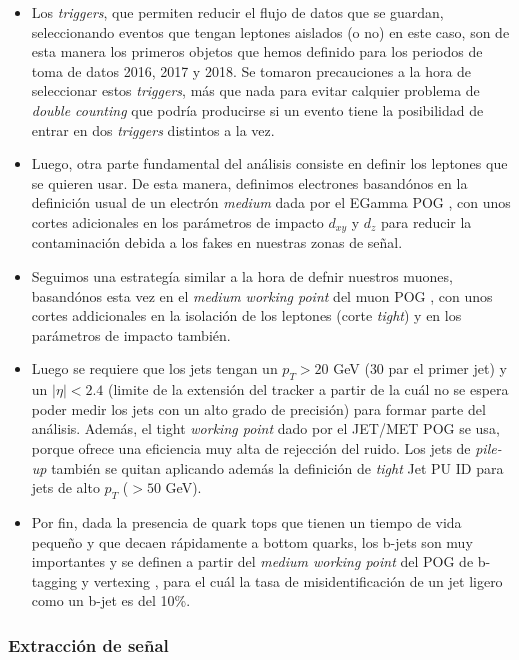 \documentclass[a4paper, 10pt, openright]{report}
\begin{document}
\begin{appendices}
\begin{itemize}
\item Los \textit{triggers}, que permiten reducir el flujo de datos que se guardan, seleccionando eventos que tengan leptones aislados (o no) en este caso, son de esta manera los primeros objetos que hemos definido para los periodos de toma de datos 2016, 2017 y 2018. Se tomaron precauciones a la hora de seleccionar estos \textit{triggers}, m\'{a}s que nada para evitar calquier problema de \textit{double counting} que podr\'{i}a producirse si un evento tiene la posibilidad de entrar en dos \textit{triggers} distintos a la vez. 
\item Luego, otra parte fundamental del an\'{a}lisis consiste en definir los leptones que se quieren usar. De esta manera, definimos electrones basand\'{o}nos en la definici\'{o}n usual de un electr\'{o}n \textit{medium} dada por el EGamma \ac{POG} \cite{ElePOG}, con unos cortes adicionales en los par\'{a}metros de impacto $d_{xy}$ y $d_z$ para reducir la contaminaci\'{o}n debida a los fakes en nuestras zonas de se\~{n}al. 
\item Seguimos una estrateg\'{i}a similar a la hora de defnir nuestros muones, basand\'{o}nos esta vez en el \textit{medium working point} del muon \ac{POG} \cite{MuonWPs}, con unos cortes addicionales en la isolaci\'{o}n de los leptones (corte \textit{tight}) y en los par\'{a}metros de impacto tambi\'{e}n.
\item Luego se requiere que los jets tengan un $p_T > 20$ GeV ($30$ par el primer jet) y un $|\eta| < 2.4$ (limite de la extensi\'{o}n del tracker a partir de la cu\'{a}l no se espera poder medir los jets con un alto grado de precisi\'{o}n) para formar parte del an\'{a}lisis. Adem\'{a}s, el tight \textit{working point} dado por el JET/MET \ac{POG} \cite{JETMETPOG} se usa, porque ofrece una eficiencia muy alta de rejecci\'{o}n del ruido. Los jets de \textit{pile-up} tambi\'{e}n se quitan aplicando adem\'{a}s la definici\'{o}n de \textit{tight} Jet \ac{PU} ID para jets de alto $p_T$ ($> 50$ GeV).
\item Por fin, dada la presencia de quark tops que tienen un tiempo de vida peque\~{n}o y que decaen r\'{a}pidamente a bottom quarks, los b-jets son muy importantes y se definen a partir del \textit{medium working point} del \ac{POG} de b-tagging y vertexing \cite{BTagPOG}, para el cu\'{a}l la tasa de misidentificaci\'{o}n de un jet ligero como un b-jet es del 10\%.
\end{itemize}

\subsubsection{Extracci\'{o}n de se\~{n}al}


\end{appendices}
\end{document}
